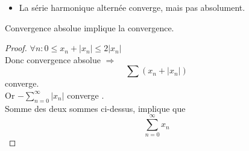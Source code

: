 \documentclass[../main.tex]{subfiles}
\begin{document}
\begin{exemple}
\begin{itemize}
\item La série harmonique alternée converge, mais pas absolument.
\end{itemize}
\begin{lemma}
Convergence absolue implique la convergence.
\end{lemma}
\begin{proof}
$\forall n: 0 \leq x_n + |x_n| \leq 2 |x_n|$\\
Donc convergence absolue  $\Rightarrow$ 
\[ 
	\sum ( x_n + |x_n|)
\]
converge.\\
Or $ -\sum_{n=0}^{ \infty} |x_n|$
converge .\\
Somme des deux sommes ci-dessus, implique que
\[ 
\sum_{n=0}^{ \infty} x_n
\]


\end{proof}
\end{exemple}
\end{document}
